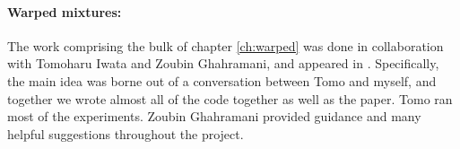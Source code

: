 \paragraph{Warped mixtures:}
The work comprising the bulk of chapter \ref{ch:warped} was done in collaboration with Tomoharu Iwata and Zoubin Ghahramani, and appeared in \citep{IwaDuvGha12}.
Specifically, the main idea was borne out of a conversation between Tomo and myself, and together we wrote almost all of the code together as well as the paper.
Tomo ran most of the experiments.
Zoubin Ghahramani provided guidance and many helpful suggestions throughout the project.

\fi

\outbpdocument{


}



